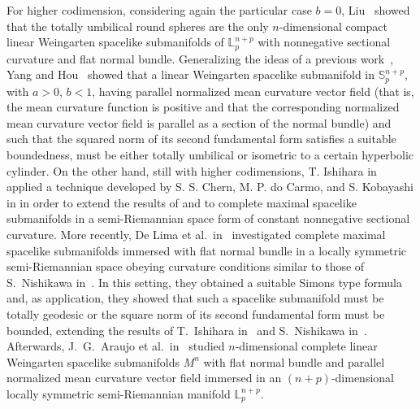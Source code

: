 \documentclass[leqno,11pt]{amsart}
\theoremstyle{plain}
\theoremstyle{definition}
\numberwithin{equation}{section}
\begin{document}
For higher codimension, considering again the particular case $b=0$, Liu~\cite{Liu:01} showed that the totally umbilical round spheres are the only $n$-dimensional compact linear Weingarten spacelike submanifolds of $\mathbb{L}_{p}^{n+p}$ with nonnegative sectional curvature and flat normal bundle. Generalizing the ideas of a previous work~\cite{Dan: 10}, Yang and Hou~\cite{Dan: 12} showed that a linear Weingarten spacelike submanifold in $\mathbb S_{p}^{n+p}$, with $a>0$, $b<1$, having parallel normalized mean curvature vector field (that is, the mean curvature function is positive and that the corresponding normalized mean curvature vector field is parallel as a section of the normal bundle) and such that the squared norm of its second fundamental form satisfies a suitable boundedness, must be either totally umbilical or isometric to a certain hyperbolic cylinder. On the other hand, still with higher codimensions, T. Ishihara in \cite{Ishihara: 88} applied a technique developed by S. S. Chern, M. P. do Carmo, and S. Kobayashi in \cite{Chern: 70} in order to extend the results of \cite{Calabi: 70} and \cite{Cheng: 76} to complete maximal spacelike submanifolds in a semi-Riemannian space form of constant nonnegative sectional curvature. More recently, De Lima et al.\ in~\cite{De Lima: 17} investigated complete maximal spacelike submanifolds immersed with flat normal bundle in a locally symmetric semi-Riemannian space obeying curvature conditions similar to those of S.~Nishikawa in~\cite{Nishikawa: 84}. In this setting, they obtained a suitable Simons type formula and, as application, they showed that such a spacelike submanifold must be totally geodesic or the square norm of its second fundamental form must be bounded, extending the results of T.~Ishihara in~\cite{Ishihara: 88} and S.~Nishikawa in~\cite{Nishikawa: 84}. Afterwards, J.~G.~Araujo et al.\ in~\cite{Araujo:17} studied $n$-dimensional complete linear Weingarten spacelike submanifolds $M^n$ with flat normal bundle and parallel normalized mean curvature vector field immersed in an $(n + p)$-dimensional locally symmetric semi-Riemannian manifold $\mathbb{L}_{p}^{n+p}$. 
\end{document}
